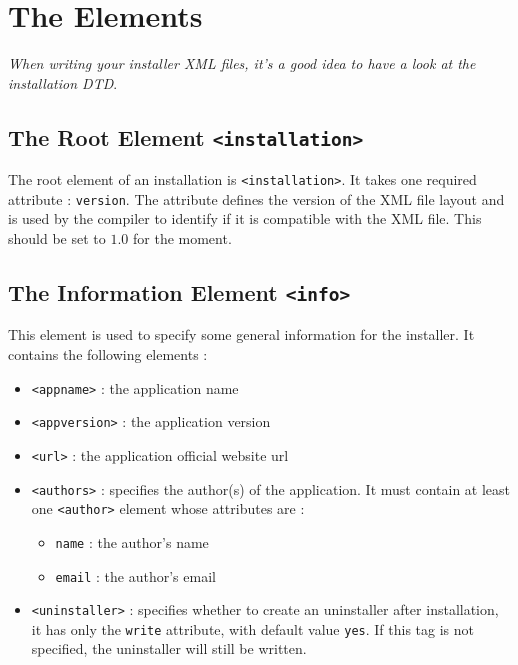 \section{The \IzPack Elements}

\noindent
\textit{When writing your installer XML files, it's a good idea to have a look
at the \IzPack installation DTD}.\\

\subsection{The Root Element \texttt{<installation>}}

The root element of an installation is \texttt{<installation>}. It takes
one required attribute : \texttt{version}. The attribute defines the
version of the XML file layout and is used by the compiler to identify
if it is compatible with the XML file. This should be set to $1.0$ for
the moment.\\

\subsection{The Information Element \texttt{<info>}}

This element is used to specify some general information for the installer. It
contains the following elements :
\begin{itemize}

  \item \texttt{<appname>} : the application name
  \item \texttt{<appversion>} : the application version
  \item \texttt{<url>} : the application official website url
  \item \texttt{<authors>} : specifies the author(s) of the application. It must contain
  at least one \texttt{<author>} element whose attributes are :
  \begin{itemize}
    \item \texttt{name} : the author's name
    \item \texttt{email} : the author's email
  \end{itemize}
  \item \texttt{<uninstaller>} : specifies whether to create an uninstaller after installation, it has only the \texttt{write} attribute, with default value \texttt{yes}. If this tag is not specified, the uninstaller will still be written.

\end{itemize}\

